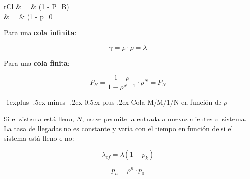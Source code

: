 \documentclass[10pt,landscape]{article}
\makeatletter
\renewcommand{\subsection}{\@startsection{subsection}{2}{0mm}%
                                {-1explus -.5ex minus -.2ex}%
                                {0.5ex plus .2ex}%
                                {\normalfont\normalsize\bfseries}}
\makeatother
\begin{document}
\begin{multicols}{3}
\begin{center}
\end{center}

	\begin{IEEEeqnarray*}{rCl}
		\gamma & = & \lambda \cdot (1 - P_{B}) \\
			     & = & \mu \cdot (1 - p_{0}		
	\end{IEEEeqnarray*}
	
Para una \textbf{cola infinita}:

	\begin{equation*}
		\gamma = \mu \cdot \rho = \lambda
	\end{equation*}
	
Para una \textbf{cola finita}:

	\begin{equation*}
		P_{B} = \frac{1 - \rho}{1 - \rho^{N+1}} \cdot \rho^{N} = P_{N}
	\end{equation*}
	
\subsection{Cola M/M/1/N en función de $\rho$}

Si el sistema está lleno, $N$, no se permite la entrada a nuevos clientes al sistema. La tasa de llegadas no es constante y varía con el tiempo en función de si el sistema está lleno o no:
	
	\begin{equation*}
	\lambda_{ef} = \lambda (1 - p_{k})
	\end{equation*}
	
	\begin{equation*}
	p_{n} = \rho^{n} \cdot p_{0}
	\end{equation*}
	

\end{multicols}
\end{document}

